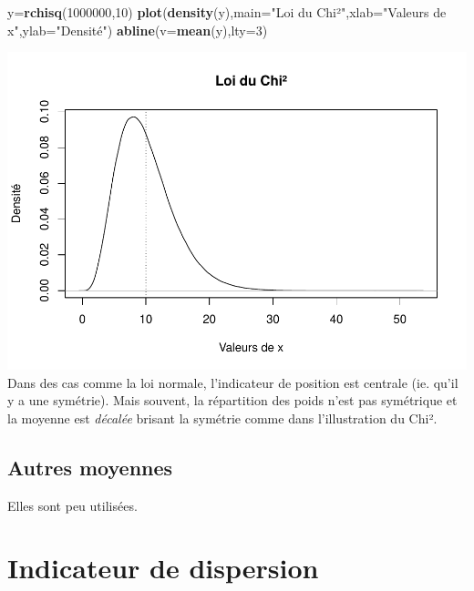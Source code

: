 \documentclass[
]{book}
\newenvironment{Shaded}{\begin{snugshade}}{\end{snugshade}}
\newcommand{\AttributeTok}[1]{\textcolor[rgb]{0.13,0.29,0.53}{#1}}
\newcommand{\DecValTok}[1]{\textcolor[rgb]{0.00,0.00,0.81}{#1}}
\newcommand{\FunctionTok}[1]{\textcolor[rgb]{0.13,0.29,0.53}{\textbf{#1}}}
\newcommand{\NormalTok}[1]{#1}
\newcommand{\OtherTok}[1]{\textcolor[rgb]{0.56,0.35,0.01}{#1}}
\newcommand{\StringTok}[1]{\textcolor[rgb]{0.31,0.60,0.02}{#1}}
\begin{document}
\begin{Shaded}
\begin{Highlighting}[]
\NormalTok{y}\OtherTok{=}\FunctionTok{rchisq}\NormalTok{(}\DecValTok{1000000}\NormalTok{,}\DecValTok{10}\NormalTok{)}
\FunctionTok{plot}\NormalTok{(}\FunctionTok{density}\NormalTok{(y),}\AttributeTok{main=}\StringTok{"Loi du Chi²"}\NormalTok{,}\AttributeTok{xlab=}\StringTok{"Valeurs de x"}\NormalTok{,}\AttributeTok{ylab=}\StringTok{"Densité"}\NormalTok{)}
\FunctionTok{abline}\NormalTok{(}\AttributeTok{v=}\FunctionTok{mean}\NormalTok{(y),}\AttributeTok{lty=}\DecValTok{3}\NormalTok{)}
\end{Highlighting}
\end{Shaded}

\includegraphics{_main_files/figure-latex/unnamed-chunk-7-1.pdf}
Dans des cas comme la loi normale, l'indicateur de position est centrale (ie. qu'il
y a une symétrie). Mais souvent, la répartition des poids n'est pas symétrique
et la moyenne est \emph{décalée} brisant la symétrie comme dans l'illustration
du Chi².

\hypertarget{autres-moyennes}{%
\subsection{Autres moyennes}\label{autres-moyennes}}

Elles sont peu utilisées.

\hypertarget{indicateur-de-dispersion}{%
\section{Indicateur de dispersion}\label{indicateur-de-dispersion}}
\end{document}
